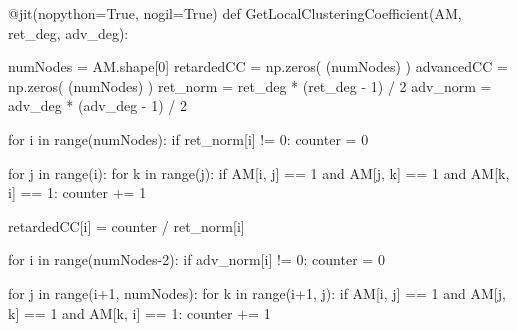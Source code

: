 \documentclass[
  letterpaper,
]{report}
\newenvironment{Shaded}{\begin{snugshade}}{\end{snugshade}}
\newcommand{\AttributeTok}[1]{\textcolor[rgb]{0.40,0.45,0.13}{#1}}
\newcommand{\BuiltInTok}[1]{\textcolor[rgb]{0.00,0.23,0.31}{#1}}
\newcommand{\ControlFlowTok}[1]{\textcolor[rgb]{0.00,0.23,0.31}{#1}}
\newcommand{\DecValTok}[1]{\textcolor[rgb]{0.68,0.00,0.00}{#1}}
\newcommand{\KeywordTok}[1]{\textcolor[rgb]{0.00,0.23,0.31}{#1}}
\newcommand{\NormalTok}[1]{\textcolor[rgb]{0.00,0.23,0.31}{#1}}
\newcommand{\OperatorTok}[1]{\textcolor[rgb]{0.37,0.37,0.37}{#1}}
\newcommand{\VariableTok}[1]{\textcolor[rgb]{0.07,0.07,0.07}{#1}}
\begin{document}
\begin{Shaded}
\begin{Highlighting}[]
\AttributeTok{@jit}\NormalTok{(nopython}\OperatorTok{=}\VariableTok{True}\NormalTok{, nogil}\OperatorTok{=}\VariableTok{True}\NormalTok{) }
\KeywordTok{def}\NormalTok{ GetLocalClusteringCoefficient(AM, ret\_deg, adv\_deg):}
    
\NormalTok{    numNodes }\OperatorTok{=}\NormalTok{ AM.shape[}\DecValTok{0}\NormalTok{]}
\NormalTok{    retardedCC }\OperatorTok{=}\NormalTok{ np.zeros( (numNodes) )}
\NormalTok{    advancedCC }\OperatorTok{=}\NormalTok{ np.zeros( (numNodes) )}
\NormalTok{    ret\_norm }\OperatorTok{=}\NormalTok{ ret\_deg }\OperatorTok{*}\NormalTok{ (ret\_deg }\OperatorTok{{-}} \DecValTok{1}\NormalTok{) }\OperatorTok{/} \DecValTok{2}
\NormalTok{    adv\_norm }\OperatorTok{=}\NormalTok{ adv\_deg }\OperatorTok{*}\NormalTok{ (adv\_deg }\OperatorTok{{-}} \DecValTok{1}\NormalTok{) }\OperatorTok{/} \DecValTok{2}
    
    \ControlFlowTok{for}\NormalTok{ i }\KeywordTok{in} \BuiltInTok{range}\NormalTok{(numNodes):}
        \ControlFlowTok{if}\NormalTok{ ret\_norm[i] }\OperatorTok{!=} \DecValTok{0}\NormalTok{: }
\NormalTok{            counter }\OperatorTok{=} \DecValTok{0}
            
            \ControlFlowTok{for}\NormalTok{ j }\KeywordTok{in} \BuiltInTok{range}\NormalTok{(i):}
                \ControlFlowTok{for}\NormalTok{ k }\KeywordTok{in} \BuiltInTok{range}\NormalTok{(j): }
                    \ControlFlowTok{if}\NormalTok{ AM[i, j] }\OperatorTok{==} \DecValTok{1} \KeywordTok{and}\NormalTok{ AM[j, k] }\OperatorTok{==} \DecValTok{1} \KeywordTok{and}\NormalTok{ AM[k, i] }\OperatorTok{==} \DecValTok{1}\NormalTok{: }
\NormalTok{                        counter }\OperatorTok{+=} \DecValTok{1}
                        
\NormalTok{            retardedCC[i] }\OperatorTok{=}\NormalTok{ counter }\OperatorTok{/}\NormalTok{ ret\_norm[i]}
    
    \ControlFlowTok{for}\NormalTok{ i }\KeywordTok{in} \BuiltInTok{range}\NormalTok{(numNodes}\OperatorTok{{-}}\DecValTok{2}\NormalTok{):}
        \ControlFlowTok{if}\NormalTok{ adv\_norm[i] }\OperatorTok{!=} \DecValTok{0}\NormalTok{: }
\NormalTok{            counter }\OperatorTok{=} \DecValTok{0}
            
            \ControlFlowTok{for}\NormalTok{ j }\KeywordTok{in} \BuiltInTok{range}\NormalTok{(i}\OperatorTok{+}\DecValTok{1}\NormalTok{, numNodes):}
                \ControlFlowTok{for}\NormalTok{ k }\KeywordTok{in} \BuiltInTok{range}\NormalTok{(i}\OperatorTok{+}\DecValTok{1}\NormalTok{, j): }
                    \ControlFlowTok{if}\NormalTok{ AM[i, j] }\OperatorTok{==} \DecValTok{1} \KeywordTok{and}\NormalTok{ AM[j, k] }\OperatorTok{==} \DecValTok{1} \KeywordTok{and}\NormalTok{ AM[k, i] }\OperatorTok{==} \DecValTok{1}\NormalTok{: }
\NormalTok{                        counter }\OperatorTok{+=} \DecValTok{1}
                        

\end{Highlighting}
\end{Shaded}
\end{document}
